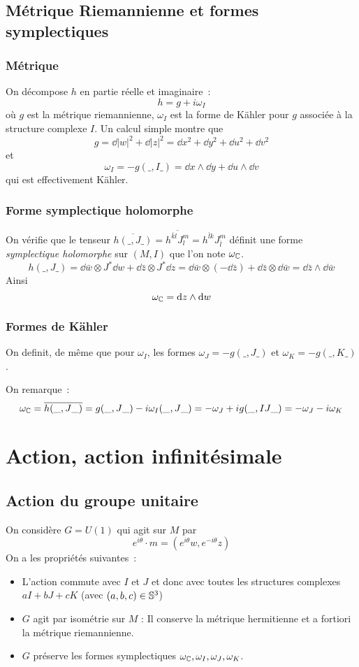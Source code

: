 \documentclass[a4paper,10pt]{article}
\begin{document}
\subsection{Métrique Riemannienne et formes symplectiques}
\subsubsection{Métrique}
On décompose $h$ en partie réelle et imaginaire~:
\[
h = g + i \omega_I
\]
où $g$ est la métrique riemannienne, $\omega_I$ est la forme de Kähler pour $g$ associée à la structure complexe $I$.
Un calcul simple montre que 
\[
g =  \dd |w|^2 + \dd |z|^2 = \dd x^2 + \dd y^2 + \dd u^2 +\dd v^2
\]
et
\[
\omega_I = -g(\_,I\_) = \dd x \wedge  \dd y + \dd u \wedge \dd v
\]
qui est effectivement Kähler.

\subsubsection{Forme symplectique holomorphe}
On vérifie que le tenseur $\overline{h(\_,J\_)} = \overline{h^{\bar{k}l}J_l^m} = h^{\bar{l}k}J_{\bar{l}}^m$ définit une forme \textit{symplectique holomorphe} sur $(M,I)$ que l'on note $\omega_\C$\label{symplectique holomorphe, omegaC}.
\[
h(\_,J\_) = \dd \bar{w} \otimes J^*\dd w + \dd \bar{z} \otimes J^*\dd z = \dd \bar{w} \otimes (-\dd \bar{z}) + \dd \bar{z} \otimes \dd \bar{w} = \dd \bar{z} \wedge \dd \bar{w}
\]
Ainsi
\begin{equation}
\omega_\C = \dd z \wedge \dd w
\end{equation}

\subsubsection{Formes de Kähler}
On definit, de même que pour $\omega_I$, les formes $\omega_J = -g(\_,J\_)$ et $\omega_K = -g(\_,K\_)$. 

On remarque~:
\[
\omega_\C = \overline{h(\_,J\_)} = g(\_,J\_) - i \omega_I(\_,J\_)= -\omega_J +i g(\_,IJ\_) = -\omega_J - i\omega_K
\]
\section{Action, action infinitésimale}

\subsection{Action du groupe unitaire}
On considère $G = U(1)$ qui agit sur $M$ par
\[
e^{i\theta}\cdot m = (e^{i\theta}w , e^{-i\theta}z)
\]
On a les propriétés suivantes~:
\begin{itemize}
\item L'action commute avec $I$ et $J$ et donc avec toutes les structures complexes $aI+bJ+cK$ (avec $(a,b,c) \in \S^3$)
\item $G$ agit par isométrie sur $M$ : Il conserve la métrique hermitienne et a fortiori la métrique riemannienne.
\item $G$ préserve les formes symplectiques $\omega_\C,\omega_I,\omega_J,\omega_K$.
\end{itemize}
\end{document}
